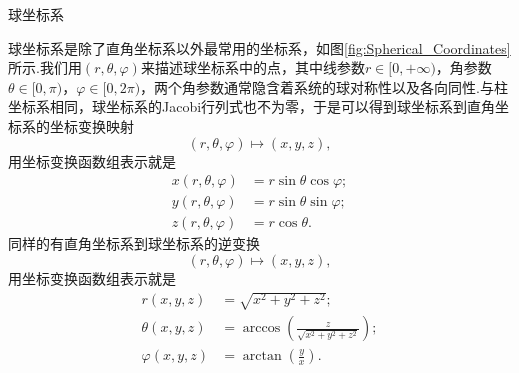 	\begin{marginfigure}
		\centering
		
		\caption{球坐标系}\label{fig:Spherical_Coordinates}
	\end{marginfigure}
	球坐标系是除了直角坐标系以外最常用的坐标系，如图\ref{fig:Spherical_Coordinates}所示.我们用$(r,\theta,\varphi)$来描述球坐标系中的点，其中线参数$r\in[0,+\infty)$，角参数$\theta\in[0,\pi)$，$\varphi\in[0,2\pi)$，两个角参数通常隐含着系统的球对称性以及各向同性.与柱坐标系相同，球坐标系的Jacobi行列式也不为零，于是可以得到球坐标系到直角坐标系的坐标变换映射
	\begin{equation}\label{eq:rthetaphi to xyz 1}
		(r,\theta,\varphi)\mapsto(x,y,z),
	\end{equation}
	用坐标变换函数组表示就是
	\begin{equation}\label{eq:rthetaphi to xyz 2}
		\begin{split}
			x(r,\theta,\varphi)&=r\sin\theta \cos\varphi;\\
			y(r,\theta,\varphi)&=r\sin\theta \sin\varphi;\\
			z(r,\theta,\varphi)&=r\cos\theta.
		\end{split}
	\end{equation}
	同样的有直角坐标系到球坐标系的逆变换
	\begin{equation}\label{eq:xyz to rthetaphi 1}
		(r,\theta,\varphi)\mapsto(x,y,z),
	\end{equation}
	用坐标变换函数组表示就是
	\begin{equation}\label{eq:xyz to rthetaphi 2}
		\begin{split}
			r(x,y,z)&=\sqrt{x^2+y^2+z^2};\\
			\theta(x,y,z)&=\arccos\left(\frac{z}{\sqrt{x^2+y^2+z^2}}\right);\\
			\varphi(x,y,z)&=\arctan(\frac{y}{x}).
		\end{split}
	\end{equation}

